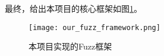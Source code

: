 最终，给出本项目的核心框架如图\ref{pic:off}。

\begin{figure}[H]
    \centering
    \texttt{[image: our\_fuzz\_framework.png]}
    \caption{本项目实现的Fuzz框架}
    \label{pic:off}
\end{figure}